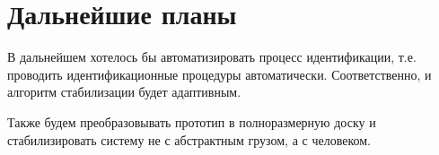 \documentclass[12pt,a4paper]{article}
\begin{document}
\section{Дальнейшие планы}

В дальнейшем хотелось бы автоматизировать процесс идентификации, т.е. проводить идентификационные процедуры автоматически. Соответственно, и алгоритм стабилизации будет адаптивным.

Также будем преобразовывать прототип в полноразмерную доску и стабилизировать систему не с абстрактным грузом, а с человеком.

\newpage


\end{document}
